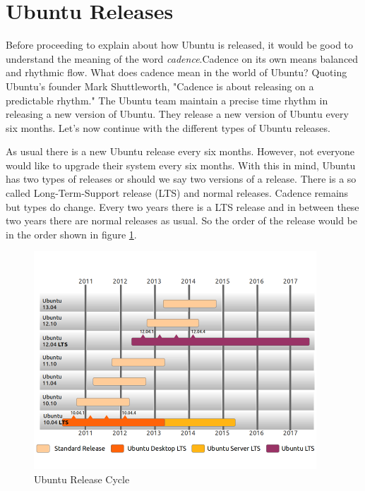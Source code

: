 \section{Ubuntu Releases} \label{chap:about_ubuntu_release} 
Before proceeding to explain about how Ubuntu is released, it would be good to understand the meaning of the word \emph{cadence}.Cadence on its own means balanced and rhythmic flow. What does cadence mean in the world of Ubuntu? Quoting Ubuntu's founder Mark Shuttleworth, "Cadence is about releasing on a predictable rhythm." The Ubuntu team maintain a precise time rhythm in releasing a new version of Ubuntu. They release a new version of Ubuntu every six months. Let's now continue with the different types of Ubuntu releases.\\

\par \noindent As usual there is a new Ubuntu release every six months. However, not everyone would like to upgrade their system every six months. With this in mind, Ubuntu has two types of releases or should we say two versions of a release. There is a so called Long-Term-Support release (LTS) and normal releases. Cadence remains but types do change. Every two years there is a LTS release and in between these two years there are normal releases as usual. So the order of the release would be in the order shown in figure \ref{fig:ubuntu-release-cycle}. \\

\begin{figure}[h]	
	\begin{center}
	\includegraphics[width=300pt]{./images/about-ubuntu/ubuntu-release-cycle.png}
	\caption{Ubuntu Release Cycle}	
	\label{fig:ubuntu-release-cycle}	
	\end{center}
\end{figure}

